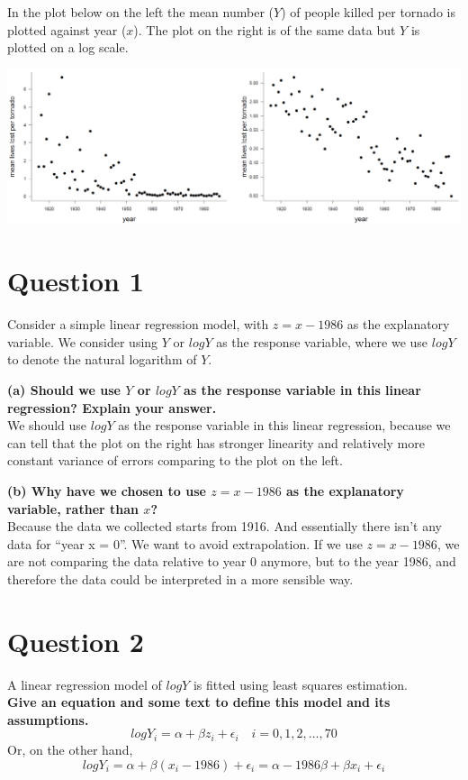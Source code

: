 \documentclass[
]{book}
\begin{document}
In the plot below on the left the mean number (\(Y\)) of people killed per tornado is plotted against year (\(x\)). The plot on the right is of the same data but \(Y\) is plotted on a log scale.

\includegraphics{tornado.png}

\section{Question 1}\label{question-1-5}

Consider a simple linear regression model, with \(z = x - 1986\) as the explanatory variable. We consider using \(Y\) or \(log Y\) as the response variable, where we use \(log Y\) to denote the natural logarithm of \(Y\).

\textbf{(a) Should we use \(Y\) or \(log Y\) as the response variable in this linear regression? Explain your answer.}\\
We should use \(log Y\) as the response variable in this linear regression, because we can tell that the plot on the right has stronger linearity and relatively more constant variance of errors comparing to the plot on the left.

\textbf{(b) Why have we chosen to use \(z = x - 1986\) as the explanatory variable, rather than \(x\)?}\\
Because the data we collected starts from 1916. And essentially there isn't any data for ``year x = 0''. We want to avoid extrapolation. If we use \(z = x - 1986\), we are not comparing the data relative to year 0 anymore, but to the year 1986, and therefore the data could be interpreted in a more sensible way.

\section{Question 2}\label{question-2-5}

A linear regression model of \(log Y\) is fitted using least squares estimation.\\
\textbf{Give an equation and some text to define this model and its assumptions.}\\
\[log Y_i =  \alpha + \beta z_i + \epsilon_i \quad i = 0, 1, 2, ..., 70\]
Or, on the other hand,
\[log Y_i = \alpha + \beta (x_i - 1986) + \epsilon_i = \alpha -1986\beta + \beta x_i + \epsilon_i\]
\end{document}
